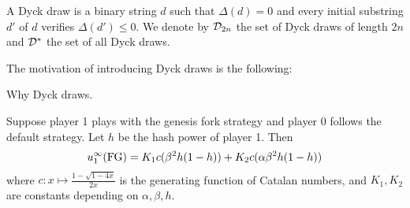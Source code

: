 \begin{mydef}
 A Dyck draw is a binary string $d$ such that $\Delta(d)=0$ and every initial substring $d'$ of $d$ verifies $\Delta(d')\leq 0$. We denote by $\mathcal{D}_{2n}$ the set of Dyck draws of length $2n$ and $\mathcal{D}^\ast$ the set of all Dyck draws.
\end{mydef}


The motivation of introducing Dyck draws is the following:
\begin{mylem}
Why Dyck draws.
\end{mylem}



\begin{myprop}
	\label{prop-utilityofgenesisinfinite}
	Suppose player 1 plays with the genesis fork strategy and player 0 follows the default strategy. Let $h$ be the hash power of player 1. Then
	\begin{eqnarray*}
		u_1^\infty(\text{\rm FG}) =K_1c(\beta^2h(1-h))+K_2c(\alpha\beta^2h(1-h))
	\end{eqnarray*}
where $c:x\mapsto \frac{1-\sqrt{1-4x}}{2x}$ is the generating function of Catalan numbers, and $K_1,K_2$ are constants depending on $\alpha,\beta,h$.
\end{myprop}


